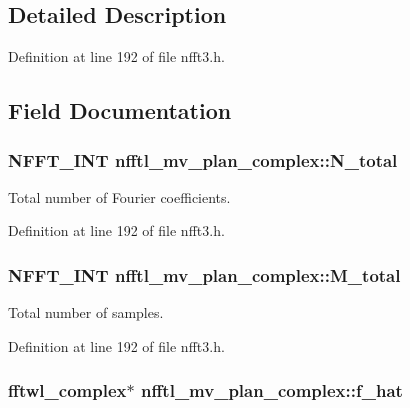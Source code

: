 \subsection{Detailed Description}


Definition at line 192 of file nfft3.\-h.



\subsection{Field Documentation}
\hypertarget{structnfftl__mv__plan__complex_a3e5765ac3a11fd4b8d83805674a6bef3}{
\subsubsection[{N\-\_\-total}]{\setlength{\rightskip}{0pt plus 5cm}N\-F\-F\-T\-\_\-\-I\-N\-T nfftl\-\_\-mv\-\_\-plan\-\_\-complex\-::\-N\-\_\-total}}\label{structnfftl__mv__plan__complex_a3e5765ac3a11fd4b8d83805674a6bef3}


Total number of Fourier coefficients. 



Definition at line 192 of file nfft3.\-h.

\hypertarget{structnfftl__mv__plan__complex_a40cb228daa088391a60bb3a1bda8e431}{
\subsubsection[{M\-\_\-total}]{\setlength{\rightskip}{0pt plus 5cm}N\-F\-F\-T\-\_\-\-I\-N\-T nfftl\-\_\-mv\-\_\-plan\-\_\-complex\-::\-M\-\_\-total}}\label{structnfftl__mv__plan__complex_a40cb228daa088391a60bb3a1bda8e431}


Total number of samples. 



Definition at line 192 of file nfft3.\-h.

\hypertarget{structnfftl__mv__plan__complex_ae4b3786df2416012cf16d7ed4c097791}{
\subsubsection[{f\-\_\-hat}]{\setlength{\rightskip}{0pt plus 5cm}fftwl\-\_\-complex$\ast$ nfftl\-\_\-mv\-\_\-plan\-\_\-complex\-::f\-\_\-hat}}\label{structnfftl__mv__plan__complex_ae4b3786df2416012cf16d7ed4c097791}


